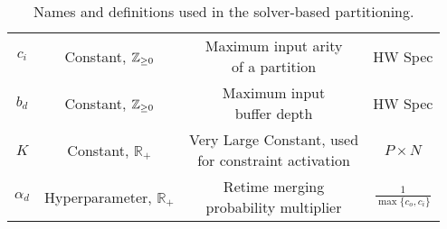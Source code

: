 \begin{table*}
\begin{tabularx}{\textwidth}{cccc}
    $c_i$ & Constant, $\mathbb{Z}_{\ge 0}$ & \ccell{Maximum input arity\\ of a partition} & HW Spec \\[0.5cm]
    $b_d$ & Constant, $\mathbb{Z}_{\ge 0}$ & \ccell{Maximum input\\ buffer depth} & HW Spec \\[0.5cm]
    $K$ & Constant, $\mathbb{R}_+$ & \ccell{Very Large Constant, used\\ for constraint activation} & $P \times N$ \\[0.5cm]
    $\alpha_d$ & Hyperparameter, $\mathbb{R}_+$ & \ccell{Retime merging\\ probability multiplier}& $\frac{1}{\max\{c_o, c_i\}}$ \\[0.5cm]
    \bottomrule
  \end{tabularx}
  \caption{Names and definitions used in the solver-based partitioning.}
  \label{tab:solver-variables}
\end{table*}

